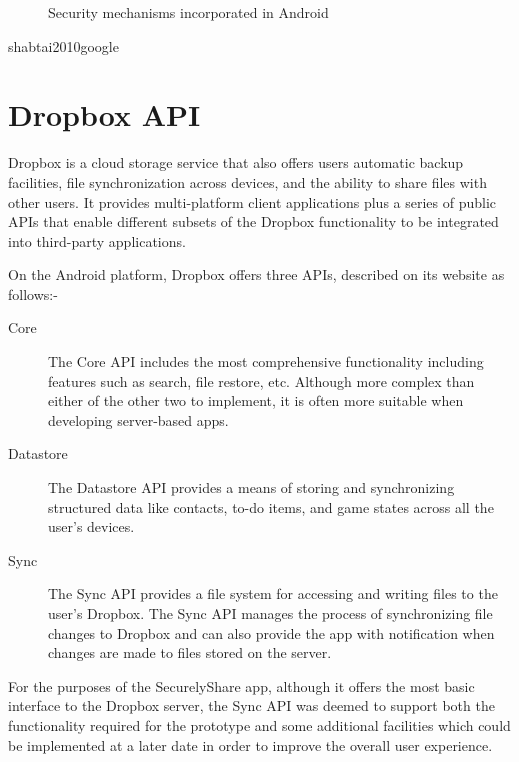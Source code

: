 \begin{figure}[h!]
                                                                                                                                                                                                                                                                                                                                                                                                                           
\caption[Security table]{Security mechanisms incorporated in Android \cite{shabtai2010google}}\label{fg:overview_pyramid}
        \label{fig:table}
\end{figure}

shabtai2010google
\\



\section{Dropbox API}
\label{sec:dropbox}
Dropbox is a cloud storage service that also offers users  automatic backup facilities, file synchronization across devices, and the ability to share files with other users.  It provides multi-platform client applications plus a series of public APIs that enable different subsets of the Dropbox functionality to be integrated into third-party applications.  

On the Android platform, Dropbox offers three APIs, described on its website as follows:-
\begin{description}
	\item[Core]The Core API includes the most comprehensive functionality including features such as search, file restore, etc. Although more complex than either of the other two to implement, it is often more suitable when developing server-based apps.
	\item[Datastore]The Datastore API provides a means of storing and synchronizing structured data like contacts, to-do items, and game states across  all the user's devices.
	\item[Sync]The Sync API provides a file system for accessing and writing files to the user's Dropbox.  The Sync API manages the process of synchronizing file changes to Dropbox and can also provide the app with notification when changes are made to files stored on the server.
\end{description}

For the purposes of the SecurelyShare app, although it offers the most basic interface to the Dropbox server, the Sync API was deemed to support both the functionality required for the prototype and some additional facilities which could be implemented at a later date in order to improve the overall user experience.


